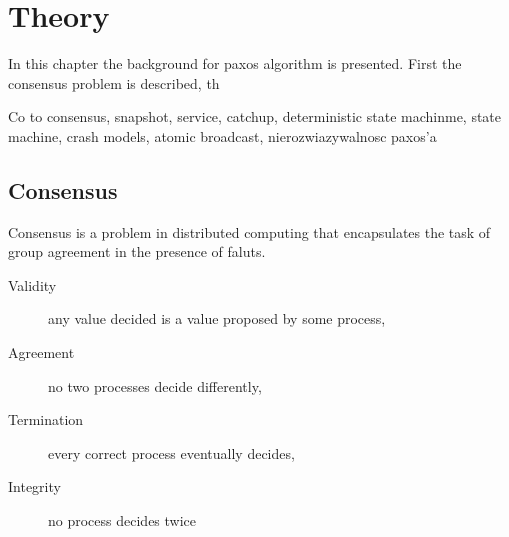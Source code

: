 \chapter{Theory}

%

In this chapter the background for paxos algorithm is presented. First the consensus problem is described, th


Co to consensus, snapshot, service, catchup, deterministic state machinme, state machine, 
crash models, atomic broadcast, nierozwiazywalnosc paxos'a

\section{Consensus}

Consensus is a problem in distributed computing that encapsulates the task of group agreement in the presence of faluts.

\begin{description}
    \item[Validity] any value decided is a value proposed by some process,
    \item[Agreement] no two processes decide differently,
    \item[Termination] every correct process eventually decides,
    \item[Integrity] no process decides twice
\end{description}

